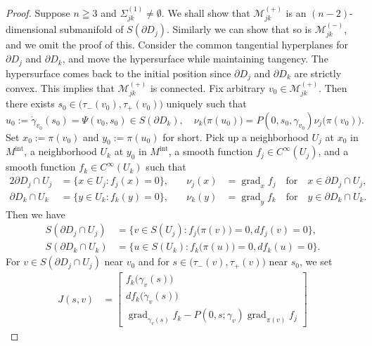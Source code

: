 \documentclass[a4paper,11pt,reqno]{amsart}
\numberwithin{equation}{section}
\theoremstyle{definition}
\theoremstyle{remark}
\begin{document}
\begin{proof}
Suppose $n\geqq3$ and $\Sigma_{jk}^{(1)}\ne\emptyset$. 
We shall show that $\mathcal{M}_{jk}^{(+)}$ is an $(n-2)$-dimensional 
submanifold of $S(\partial{D_j})$. 
Similarly we can show that so is $\mathcal{M}_{jk}^{(-)}$, and we omit the proof of this.
Consider the common tangential hyperplanes for $\partial{D_j}$ and $\partial{D_k}$, 
and move the hypersurface while maintaining tangency. 
The hypersurface comes back to the initial position 
since $\partial{D_j}$ and $\partial{D_k}$ are strictly convex. 
This implies that $\mathcal{M}_{jk}^{(+)}$ is connected.   
Fix arbitrary $v_0 \in \mathcal{M}_{jk}^{(+)}$. 
Then there exists $s_0 \in \bigl(\tau_-(v_0),\tau_+(v_0)\bigr)$ uniquely such that 
%
%
$$
u_0:=\dot\gamma_{v_0}(s_0)=\Psi(v_0,s_0) \in S(\partial{D_k}),
\quad
\nu_k\bigl(\pi(u_0)\bigr)=P(0,s_0,\gamma_{v_0})\nu_j\bigl(\pi(v_0)\bigr). 
$$
%
%
Set $x_0:=\pi(v_0)$ and $y_0:=\pi(u_0)$ for short. 
Pick up a neighborhood $U_j$ at $x_0$ in $M^\text{int}$, 
a neighborhood $U_k$ at $y_0$ in $M^\text{int}$, 
a smooth function $f_j \in C^\infty(U_j)$, 
and a smooth function $f_k \in C^\infty(U_k)$ such that 
%
%
\begin{alignat*}{2}
  \partial{D_j}{\cap}U_j
& =
  \{x \in U_j : f_j(x)=0\},
& \quad
  \nu_j(x)
& =
  \operatorname{grad}_xf_j
  \quad\text{for}\quad
  x \in \partial{D_j}{\cap}U_j,
\\
  \partial{D_k}{\cap}U_k
& =
  \{y \in U_k : f_k(y)=0\},
& \quad
  \nu_k(y)
& =
  \operatorname{grad}_yf_k
  \quad\text{for}\quad
  y \in \partial{D_k}{\cap}U_k.
\end{alignat*}
%
% 
Then we have 
%
%
\begin{align*}
  S(\partial{D_j}{\cap}U_j)
& =
  \bigl\{
  v \in S(U_j)
  :
  f_j\bigl(\pi(v)\bigr)=0, 
  df_j(v)=0 
  \bigr\},
\\
  S(\partial{D_k}{\cap}U_k)
& =
  \bigl\{
  u \in S(U_k)
  :
  f_k\bigl(\pi(u)\bigr)=0, 
  df_k(u)=0 
  \bigr\}. 
\end{align*}
%
%
For $v \in S(\partial{D_j}{\cap}U_j)$ near $v_0$ and 
for $s \in \bigl(\tau_-(v),\tau_+(v)\bigr)$ near $s_0$, we set
%
%
\begin{align*}
  J(s,v)
& =
  \begin{bmatrix}
  f_k\bigl(\gamma_v(s)\bigr)
  \\
  df_k\bigl(\dot{\gamma}_v(s)\bigr)
  \\
  \operatorname{grad}_{\gamma_v(s)}f_k - P(0,s;\gamma_v)\operatorname{grad}_{\pi(v)}f_j 
  \end{bmatrix} 

\end{align*}
\end{proof}
\end{document}
